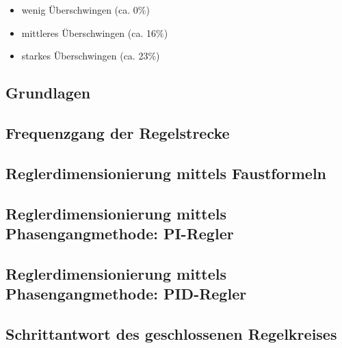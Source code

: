 \begin{itemize}
    \item
        wenig \"Uberschwingen (ca. 0\%)
    \item
        mittleres \"Uberschwingen (ca. 16\%)
    \item
        starkes \"Uberschwingen (ca. 23\%)
\end{itemize}

\subsection{Grundlagen}


\subsection{Frequenzgang der Regelstrecke}
\label{subs:frequenzgang}


\subsection{Reglerdimensionierung mittels Faustformeln}
\label{subs:faustformeln}


\subsection{Reglerdimensionierung mittels Phasengangmethode: PI-Regler}
\label{subs:phasengang:pi}


\subsection{Reglerdimensionierung mittels Phasengangmethode: PID-Regler}
\label{subs:phasengang:pid}


%

%

%

\subsection{Schrittantwort des geschlossenen Regelkreises}

